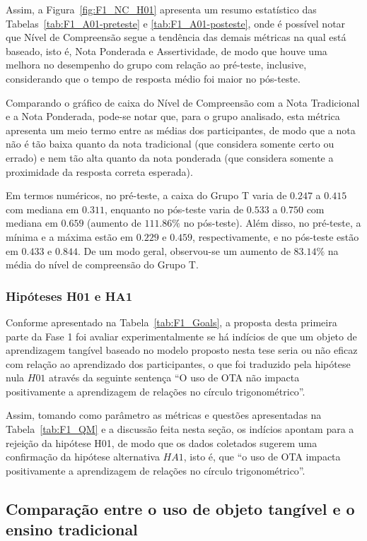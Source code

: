 Assim, a Figura~\ref{fig:F1_NC_H01} apresenta um resumo estatístico das Tabelas~\ref{tab:F1_A01-preteste} e \ref{tab:F1_A01-posteste}, onde é possível notar que Nível de Compreensão segue a tendência das demais métricas na qual está baseado, isto é, Nota Ponderada e Assertividade, de modo que houve uma melhora no desempenho do grupo com relação ao pré-teste, inclusive, considerando que o tempo de resposta médio foi maior no pós-teste.

Comparando o gráfico de caixa do Nível de Compreensão com a Nota Tradicional e a Nota Ponderada, pode-se notar que, para o grupo analisado, esta métrica apresenta um meio termo entre as médias dos participantes, de modo que a nota não é tão baixa quanto da nota tradicional (que considera somente certo ou errado) e nem tão alta quanto da nota ponderada (que considera somente a proximidade da resposta correta esperada).

Em termos numéricos, no pré-teste, a caixa do Grupo T varia de $0.247$ a $0.415$ com mediana em $0.311$, enquanto no pós-teste varia de $0.533$ a $0.750$ com mediana em $0.659$ (aumento de $111.86\%$ no pós-teste). Além disso, no pré-teste, a mínima e a máxima estão em $0.229$ e $0.459$, respectivamente, e no pós-teste estão em $0.433$ e $0.844$. De um modo geral, observou-se um aumento de $83.14\%$ na média do nível de compreensão do Grupo T.

\subsubsection{Hipóteses H01 e HA1}

Conforme apresentado na Tabela~\ref{tab:F1_Goals}, a proposta desta primeira parte da Fase 1 foi avaliar experimentalmente se há indícios de que um objeto de aprendizagem tangível baseado no modelo proposto nesta tese seria ou não eficaz com relação ao aprendizado dos participantes, o que foi traduzido pela hipótese nula $H01$ através da seguinte sentença ``O uso de OTA não impacta positivamente a aprendizagem de relações no círculo trigonométrico''.

Assim, tomando como parâmetro as métricas e questões apresentadas na Tabela~\ref{tab:F1_QM} e a discussão feita nesta seção, os indícios apontam para a rejeição da hipótese H01, de modo que os dados coletados sugerem uma confirmação da hipótese alternativa $HA1$, isto é, que ``o uso de OTA impacta positivamente a aprendizagem de relações no círculo trigonométrico''.

\subsection{Comparação entre o uso de objeto tangível e o ensino tradicional}\label{subsec:fase1-H02}

